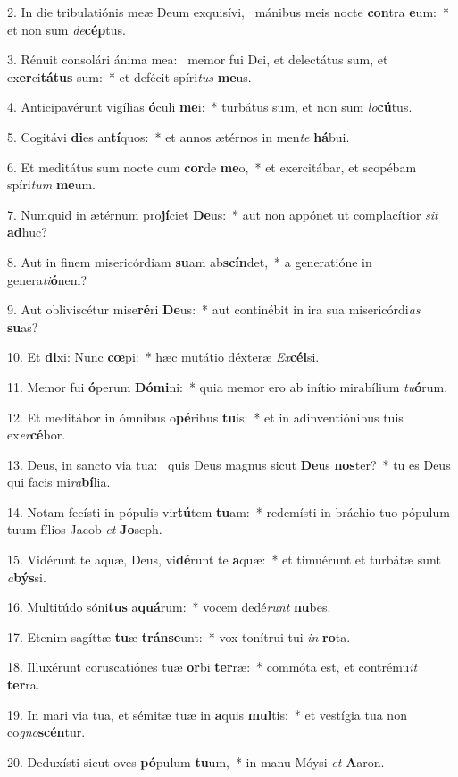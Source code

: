 2. In die tribulatiónis meæ Deum exquisívi, \dag\  mánibus meis nocte \textbf{con}tra \textbf{e}um:~*  et non sum \textit{de}\textbf{cép}tus.\

3. Rénuit consolári ánima mea: \dag\  memor fui Dei, et delectátus sum, et ex\textbf{er}ci\textbf{tá}\textbf{tus} sum:~*  et defécit spíri\textit{tus} \textbf{me}us.\

4. Anticipavérunt vigílias \textbf{ó}culi \textbf{me}i:~*  turbátus sum, et non sum \textit{lo}\textbf{cú}tus.\

5. Cogitávi \textbf{di}es an\textbf{tí}quos:~*  et annos ætérnos in men\textit{te} \textbf{há}bui.\

6. Et meditátus sum nocte cum \textbf{cor}de \textbf{me}o,~*  et exercitábar, et scopébam spíri\textit{tum} \textbf{me}um.\

7. Numquid in ætérnum pro\textbf{jí}ciet \textbf{De}us:~*  aut non appónet ut complacítior \textit{sit} \textbf{ad}huc?\

8. Aut in finem misericórdiam \textbf{su}am ab\textbf{scín}det,~*  a generatióne in genera\textit{ti}\textbf{ó}nem?\

9. Aut obliviscétur mise\textbf{ré}ri \textbf{De}us:~*  aut continébit in ira sua misericórdi\textit{as} \textbf{su}as?\

10. Et \textbf{di}xi: Nunc \textbf{cœ}pi:~*  hæc mutátio déxteræ \textit{Ex}\textbf{cél}si.\

11. Memor fui \textbf{ó}perum \textbf{Dó}\textbf{mi}ni:~*  quia memor ero ab inítio mirabílium \textit{tu}\textbf{ó}rum.\

12. Et meditábor in ómnibus o\textbf{pé}ribus \textbf{tu}is:~*  et in adinventiónibus tuis ex\textit{er}\textbf{cé}bor.\

13. Deus, in sancto via tua: \dag\  quis Deus magnus sicut \textbf{De}us \textbf{nos}ter?~*  tu es Deus qui facis mi\textit{ra}\textbf{bí}lia.\

14. Notam fecísti in pópulis vir\textbf{tú}tem \textbf{tu}am:~*  redemísti in bráchio tuo pópulum tuum fílios Jacob \textit{et} \textbf{Jo}seph.\

15. Vidérunt te aquæ, Deus, vi\textbf{dé}runt te \textbf{a}quæ:~*  et timuérunt et turbátæ sunt \textit{a}\textbf{býs}si.\

16. Multitúdo sóni\textbf{tus} a\textbf{quá}rum:~*  vocem dedé\textit{runt} \textbf{nu}bes.\

17. Etenim sagíttæ \textbf{tu}æ \textbf{tráns}\textbf{e}unt:~*  vox tonítrui tui \textit{in} \textbf{ro}ta.\

18. Illuxérunt coruscatiónes tuæ \textbf{or}bi \textbf{ter}ræ:~*  commóta est, et contrému\textit{it} \textbf{ter}ra.\

19. In mari via tua, et sémitæ tuæ in \textbf{a}quis \textbf{mul}tis:~*  et vestígia tua non co\textit{gno}\textbf{scén}tur.\

20. Deduxísti sicut oves \textbf{pó}pulum \textbf{tu}um,~*  in manu Móysi \textit{et} \textbf{A}aron.\

